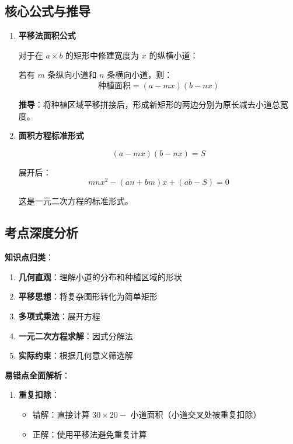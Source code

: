 \documentclass[UTF8]{ctexart}
\newenvironment{redenv}{\color{red}}{}
\newenvironment{conceptbox}{%
    \begin{tcolorbox}[colback=red!5, colframe=red!50!black, title=概念解析, fonttitle=\bfseries]
}{%
    \end{tcolorbox}
}
\newenvironment{formuladerivation}{%
    \begin{enumerate}[label={\textbf{公式\arabic*：}}, leftmargin=*, align=left]
}{%
    \end{enumerate}
}
\begin{document}
\begin{redenv}
\subsection*{核心公式与推导}

\begin{formuladerivation}
\item \textbf{平移法面积公式}

对于在 $a \times b$ 的矩形中修建宽度为 $x$ 的纵横小道：

若有 $m$ 条纵向小道和 $n$ 条横向小道，则：
\[
\text{种植面积} = (a - mx)(b - nx)
\]

\textbf{推导}：将种植区域平移拼接后，形成新矩形的两边分别为原长减去小道总宽度。

\item \textbf{面积方程标准形式}

\[
(a - mx)(b - nx) = S
\]

展开后：
\[
mnx^2 - (an + bm)x + (ab - S) = 0
\]

这是一元二次方程的标准形式。
\end{formuladerivation}

\subsection*{考点深度分析}

\begin{conceptbox}
\textbf{知识点归类}：
\begin{enumerate}
    \item \textbf{几何直观}：理解小道的分布和种植区域的形状
    \item \textbf{平移思想}：将复杂图形转化为简单矩形
    \item \textbf{多项式乘法}：展开方程
    \item \textbf{一元二次方程求解}：因式分解法
    \item \textbf{实际约束}：根据几何意义筛选解
\end{enumerate}
\end{conceptbox}

\noindent\textbf{易错点全面解析}：
\begin{enumerate}[label=\arabic*.]
    \item \textbf{重复扣除}：
    \begin{itemize}
        \item 错解：直接计算 $30 \times 20 - $ 小道面积（小道交叉处被重复扣除）
        \item 正解：使用平移法避免重复计算
    \end{itemize}
    

\end{enumerate}
\end{redenv}
\end{document}
